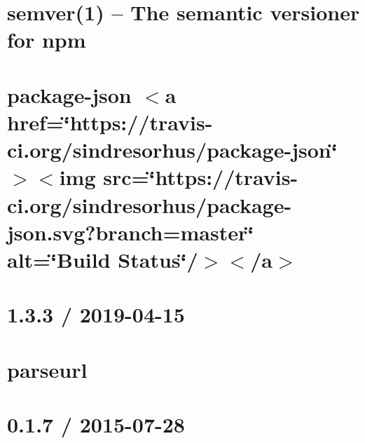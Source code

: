 \let\mypdfximage\pdfximage\def\pdfximage{\immediate\mypdfximage}\documentclass[twoside]{book}
\newcommand{\+}{\discretionary{\mbox{\scriptsize$\hookleftarrow$}}{}{}}
\begin{document}
\chapter{semver(1) -- The semantic versioner for npm}
\label{md__c_1__git_hub__p_r_o_y_e_c_t_o-_i_i_i-_g_o_t_rest-api_node_modules_package-json_node_modules_semver__r_e_a_d_m_e}

\chapter{package-\/json $<$a href=\char`\"{}https\+://travis-\/ci.\+org/sindresorhus/package-\/json\char`\"{}$>$$<$img src=\char`\"{}https\+://travis-\/ci.\+org/sindresorhus/package-\/json.\+svg?branch=master\char`\"{} alt=\char`\"{}\+Build Status\char`\"{}/$>$$<$/a$>$}
\label{md__c_1__git_hub__p_r_o_y_e_c_t_o-_i_i_i-_g_o_t_rest-api_node_modules_package-json_readme}

\chapter{1.3.3 / 2019-\/04-\/15}
\label{md__c_1__git_hub__p_r_o_y_e_c_t_o-_i_i_i-_g_o_t_rest-api_node_modules_parseurl__h_i_s_t_o_r_y}

\chapter{parseurl}
\label{md__c_1__git_hub__p_r_o_y_e_c_t_o-_i_i_i-_g_o_t_rest-api_node_modules_parseurl__r_e_a_d_m_e}

\chapter{0.1.7 / 2015-\/07-\/28}
\label{md__c_1__git_hub__p_r_o_y_e_c_t_o-_i_i_i-_g_o_t_rest-api_node_modules_path-to-regexp__history}

\end{document}
